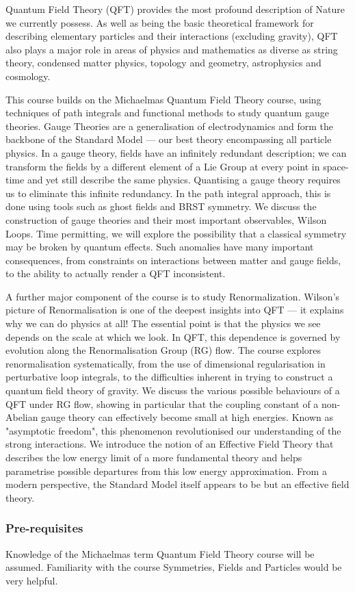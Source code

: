 \documentclass[a4paper]{article}
\begin{document}
\maketitle
{\small
\setlength{\parindent}{0em}
\setlength{\parskip}{1em}

Quantum Field Theory (QFT) provides the most profound description of Nature we currently possess. As well as being the basic theoretical framework for describing elementary particles and their interactions (excluding gravity), QFT also plays a major role in areas of physics and mathematics as diverse as string theory, condensed matter physics, topology and geometry, astrophysics and cosmology.

This course builds on the Michaelmas Quantum Field Theory course, using techniques of path integrals and functional methods to study quantum gauge theories. Gauge Theories are a generalisation of electrodynamics and form the backbone of the Standard Model --- our best theory encompassing all particle physics. In a gauge theory, fields have an infinitely redundant description; we can transform the fields by a different element of a Lie Group at every point in space-time and yet still describe the same physics. Quantising a gauge theory requires us to eliminate this infinite redundancy. In the path integral approach, this is done using tools such as ghost fields and BRST symmetry. We discuss the construction of gauge theories and their most important observables, Wilson Loops. Time permitting, we will explore the possibility that a classical symmetry may be broken by quantum effects. Such anomalies have many important consequences, from constraints on interactions between matter and gauge fields, to the ability to actually render a QFT inconsistent.

A further major component of the course is to study Renormalization. Wilson's picture of Renormalisation is one of the deepest insights into QFT --- it explains why we can do physics at all! The essential point is that the physics we see depends on the scale at which we look. In QFT, this dependence is governed by evolution along the Renormalisation Group (RG) flow. The course explores renormalisation systematically, from the use of dimensional regularisation in perturbative loop integrals, to the difficulties inherent in trying to construct a quantum field theory of gravity. We discuss the various possible behaviours of a QFT under RG flow, showing in particular that the coupling constant of a non-Abelian gauge theory can effectively become small at high energies. Known as "asymptotic freedom", this phenomenon revolutionised our understanding of the strong interactions. We introduce the notion of an Effective Field Theory that describes the low energy limit of a more fundamental theory and helps parametrise possible departures from this low energy approximation. From a modern perspective, the Standard Model itself appears to be but an effective field theory.

\subsubsection*{Pre-requisites}
Knowledge of the Michaelmas term Quantum Field Theory course will be assumed. Familiarity with the course Symmetries, Fields and Particles would be very helpful.
}
\end{document}
